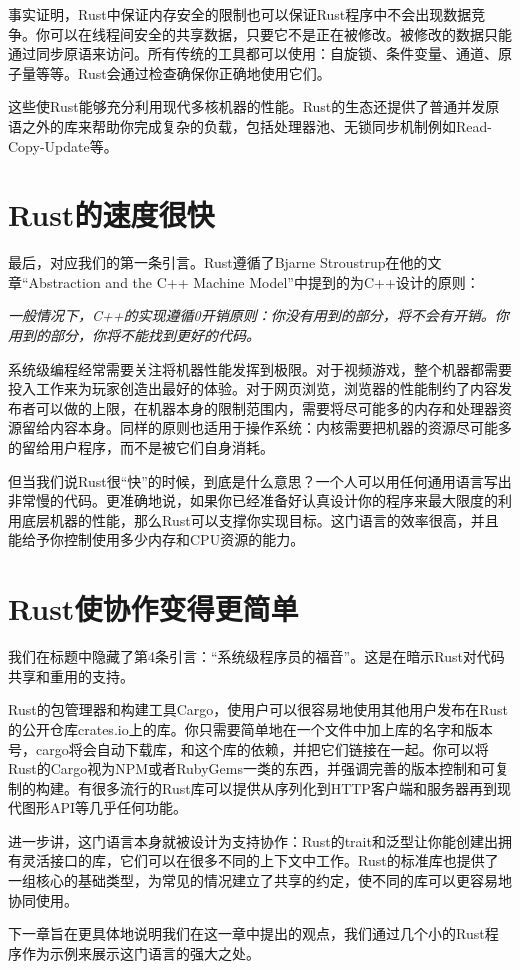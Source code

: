 事实证明，Rust中保证内存安全的限制也可以保证Rust程序中不会出现数据竞争。你可以在线程间安全的共享数据，只要它不是正在被修改。被修改的数据只能通过同步原语来访问。所有传统的工具都可以使用：自旋锁、条件变量、通道、原子量等等。Rust会通过检查确保你正确地使用它们。

这些使Rust能够充分利用现代多核机器的性能。Rust的生态还提供了普通并发原语之外的库来帮助你完成复杂的负载，包括处理器池、无锁同步机制例如Read-Copy-Update等。

\section{Rust的速度很快}
最后，对应我们的第一条引言。Rust遵循了Bjarne Stroustrup在他的文章“Abstraction and the C++ Machine Model”中提到的为C++设计的原则：

\emph{一般情况下，C++的实现遵循0开销原则：你没有用到的部分，将不会有开销。你用到的部分，你将不能找到更好的代码。}

系统级编程经常需要关注将机器性能发挥到极限。对于视频游戏，整个机器都需要投入工作来为玩家创造出最好的体验。对于网页浏览，浏览器的性能制约了内容发布者可以做的上限，在机器本身的限制范围内，需要将尽可能多的内存和处理器资源留给内容本身。同样的原则也适用于操作系统：内核需要把机器的资源尽可能多的留给用户程序，而不是被它们自身消耗。

但当我们说Rust很“快”的时候，到底是什么意思？一个人可以用任何通用语言写出非常慢的代码。更准确地说，如果你已经准备好认真设计你的程序来最大限度的利用底层机器的性能，那么Rust可以支撑你实现目标。这门语言的效率很高，并且能给予你控制使用多少内存和CPU资源的能力。

\section{Rust使协作变得更简单}
我们在标题中隐藏了第4条引言：“系统级程序员的福音”。这是在暗示Rust对代码共享和重用的支持。

Rust的包管理器和构建工具Cargo，使用户可以很容易地使用其他用户发布在Rust的公开仓库crates.io上的库。你只需要简单地在一个文件中加上库的名字和版本号，cargo将会自动下载库，和这个库的依赖，并把它们链接在一起。你可以将Rust的Cargo视为NPM或者RubyGems一类的东西，并强调完善的版本控制和可复制的构建。有很多流行的Rust库可以提供从序列化到HTTP客户端和服务器再到现代图形API等几乎任何功能。

进一步讲，这门语言本身就被设计为支持协作：Rust的trait和泛型让你能创建出拥有灵活接口的库，它们可以在很多不同的上下文中工作。Rust的标准库也提供了一组核心的基础类型，为常见的情况建立了共享的约定，使不同的库可以更容易地协同使用。

下一章旨在更具体地说明我们在这一章中提出的观点，我们通过几个小的Rust程序作为示例来展示这门语言的强大之处。